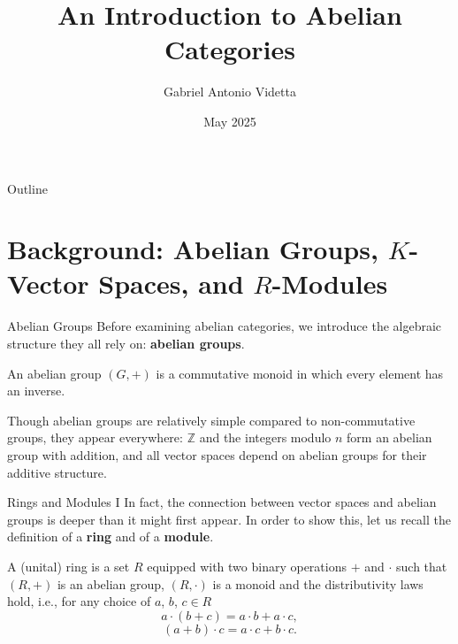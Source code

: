 \documentclass{beamer}
\title{An Introduction to Abelian Categories}
\author{Gabriel Antonio Videtta\texorpdfstring{\vspace*{-13pt}}{}}
\date{May 2025}
\newcommand{\ZZ}{\mathbb{Z}}
\begin{document}
\begin{frame}
    \titlepage
\end{frame}


\begin{frame}{Outline}
    \tableofcontents
\end{frame}



\section{Background: Abelian Groups, \texorpdfstring{$K$}{K}-Vector Spaces, and \texorpdfstring{$R$}{R}-Modules}

\begin{frame}{Abelian Groups}
    Before examining abelian categories, we
    introduce the algebraic structure they
    all rely on: \textbf{abelian groups}. \medskip

    \begin{definition}
        An abelian group $(G, +)$ is a commutative monoid
        in which every element has an inverse.
    \end{definition}

    Though abelian groups are relatively simple compared to
    non-commutative groups, they
    appear everywhere: $\ZZ$ and the integers modulo $n$ form
    an abelian group with addition, and all vector spaces depend on
    abelian groups for their additive structure.
\end{frame}

\begin{frame}{Rings and Modules I}
    In fact, the connection between vector spaces and abelian groups is
    deeper than it might first appear. In order to show this,
    let us recall the definition of a \textbf{ring} and of a \textbf{module}.

    \begin{definition}
        A (unital) ring is a set $R$ equipped with two binary operations $+$ and $\cdot$
        such that $(R, +)$ is an abelian
        group, $(R, \cdot)$ is a monoid and the distributivity laws hold, i.e.,
        for any choice of $a$, $b$, $c \in R$
        \[
            a \cdot (b + c) = a \cdot b + a \cdot c,
        \]
        \[
            (a + b) \cdot c = a \cdot c + b \cdot c.
        \]
    \end{definition}
\end{frame}
\end{document}
